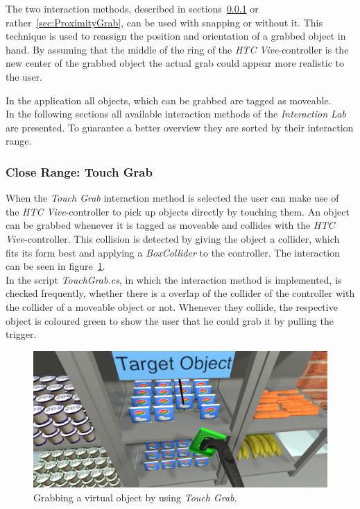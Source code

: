 The two interaction methods, described in sections~\ref{sec:TouchGrab} or rather~\ref{sec:ProximityGrab}, can be used with snapping or without it. This technique is used to reassign the position and orientation of a grabbed object in hand. By assuming that the middle of the ring of the \textit{HTC Vive}-controller is the new center of the grabbed object the actual grab could appear more realistic to the user. 

In the application all objects, which can be grabbed are tagged as moveable.\\

In the following sections all available interaction methods of the \textit{Interaction Lab} are presented. To guarantee a better overview they are sorted by their interaction range. 

\subsubsection{Close Range: Touch Grab} \label{sec:TouchGrab}
When the \textit{Touch Grab} interaction method is selected the user can make use of the \textit{HTC Vive}-controller to pick up objects directly by touching them. An object can be grabbed whenever it is tagged as moveable and collides with the \textit{HTC Vive}-controller. This collision is detected by giving the object a collider, which fits its form best \cite{website:BoxCollider}\cite{website:SphereCollider} and applying a \textit{BoxCollider} to the controller. The interaction can be seen in figure~\ref{fig:touchGrab}. \\
In the script \textit{TouchGrab.cs}, in which the interaction method is implemented, is checked frequently, whether there is a overlap of the collider of the controller with the collider of a moveable object or not. Whenever they collide, the respective object is coloured green to show the user that he could grab it by pulling the trigger. 

\begin{figure}[H] 
	\center 
	\includegraphics[width=12cm]{Images/TouchGrab.PNG}			
	\caption[Grabbing a virtual object by using \textit{Touch Grab}.]{Grabbing a virtual object by using \textit{Touch Grab}.}
	\label{fig:touchGrab}
\end{figure}

